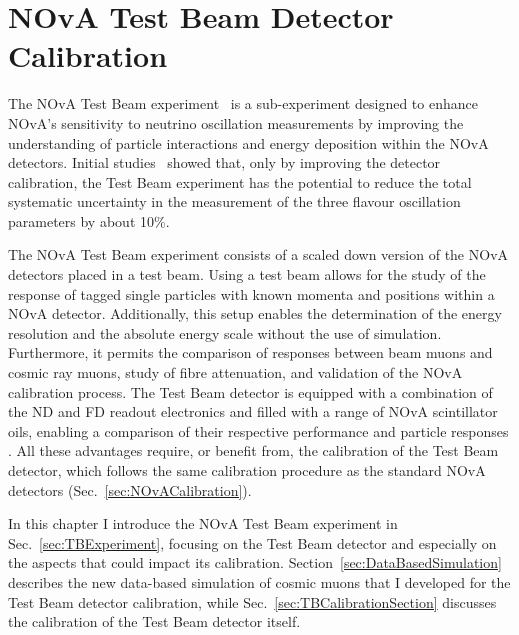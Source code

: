 \chapter{NOvA Test Beam Detector Calibration}\label{sec:TestBeamCalibration}

The \gls{NOvA} Test Beam experiment~\cite{NOvATestBeamWallbangProceedings2020.pdf} is a sub-experiment designed to enhance \gls{NOvA}'s sensitivity to neutrino oscillation measurements by improving the understanding of particle interactions and energy deposition within the \gls{NOvA} detectors. Initial studies~\cite{NOvA-doc-33012} showed that, only by improving the detector calibration, the Test Beam experiment has the potential to reduce the total systematic uncertainty in the measurement of the three flavour oscillation parameters by about 10\%.
 
The \gls{NOvA} Test Beam experiment consists of a scaled down version of the \gls{NOvA} detectors placed in a test beam. Using a test beam allows for the study of the response of tagged single particles with known momenta and positions within a \gls{NOvA} detector. Additionally, this setup enables the determination of the energy resolution and the absolute energy scale without the use of simulation. Furthermore, it permits the comparison of responses between beam muons and cosmic ray muons, study of fibre attenuation, and validation of the \gls{NOvA} calibration process. The Test Beam detector is equipped with a combination of the \gls{ND} and \gls{FD} readout electronics and filled with a range of \gls{NOvA} scintillator oils, enabling a comparison of their respective performance and particle responses \cite{NOvA-doc-15750}. All these advantages require, or benefit from, the calibration of the Test Beam detector, which follows the same calibration procedure as the standard \gls{NOvA} detectors (Sec.~\ref{sec:NOvACalibration}).

In this chapter I introduce the \gls{NOvA} Test Beam experiment in Sec.~\ref{sec:TBExperiment}, focusing on the Test Beam detector and especially on the aspects that could impact its calibration. Section~\ref{sec:DataBasedSimulation} describes the new data-based simulation of cosmic muons that I developed for the Test Beam detector calibration, while Sec.~\ref{sec:TBCalibrationSection} discusses the calibration of the Test Beam detector itself.

